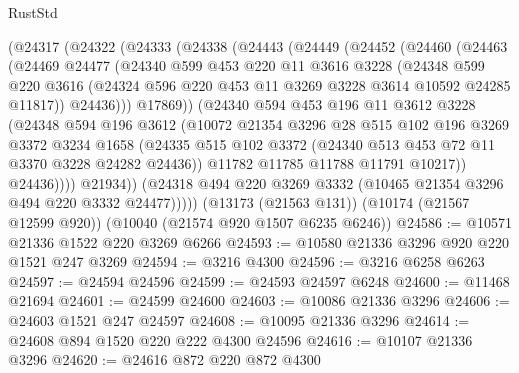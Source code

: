 \begin{lexlean}{RustStd}
\begin{coremodule}
        (@24317
          (@24322
            (@24333
              (@24338
                (@24443
                  (@24449
                    (@24452
                      (@24460
                        (@24463
                          (@24469
                            @24477
                            (@24340
                              @599
                              @453
                              @220
                              @11
                              @3616
                              @3228
                              (@24348
                                @599
                                @220
                                @3616
                                (@24324 @596 @220 @453 @11 @3269 @3228 @3614 @10592 @24285 @11817))
                              @24436)))
                        @17869))
                    (@24340
                      @594
                      @453
                      @196
                      @11
                      @3612
                      @3228
                      (@24348
                        @594
                        @196
                        @3612
                        (@10072
                          @21354
                          @3296
                          @28
                          @515
                          @102
                          @196
                          @3269
                          @3372
                          @3234
                          @1658
                          (@24335
                            @515
                            @102
                            @3372
                            (@24340 @513 @453 @72 @11 @3370 @3228 @24282 @24436))
                          @11782
                          @11785
                          @11788
                          @11791
                          @10217))
                      @24436))))
              @21934))
          (@24318 @494 @220 @3269 @3332 (@10465 @21354 @3296 @494 @220 @3332 @24477)))))
    (@13173 (@21563 @131))
    (@10174 (@21567 @12599 @920))
    (@10040 (@21574 @920 @1507 @6235 @6246))
@24586 := @10571 @21336 @1522 @220 @3269 @6266
@24593 := @10580 @21336 @3296 @920 @220 @1521 @247 @3269
@24594 := @3216 @4300
@24596 := @3216 @6258 @6263
@24597 := @24594 @24596
@24599 := @24593 @24597 @6248
@24600 := @11468 @21694
@24601 := @24599 @24600
@24603 := @10086 @21336 @3296
@24606 := @24603 @1521 @247 @24597
@24608 := @10095 @21336 @3296
@24614 := @24608 @894 @1520 @220 @222 @4300 @24596
@24616 := @10107 @21336 @3296
@24620 := @24616 @872 @220 @872 @4300

\end{coremodule}
\end{lexlean}

